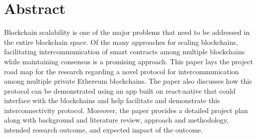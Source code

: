 \documentclass[a4paper,twoside,phd]{BYUPhys}
\begin{document}
\section{Abstract}
Blockchain scalability is one of the major problems that need to be addressed in the entire blockchain space. Of the many approaches for scaling blockchains, facilitating intercommunication of smart contracts among multiple blockchains while maintaining consensus is a promising approach. This paper lays the project road map for the research regarding a novel protocol for intercommunication among multiple private Ethereum blockchains. The paper also discusses how this protocol can be demonstrated using an app built on react-native that could interface with the blockchains and help facilitate and demonstrate this interconnectivity protocol. Moreover, the paper provides a detailed project plan along with background and literature review, approach and methodology, intended research outcome, and expected impact of the outcome.
\end{document}
